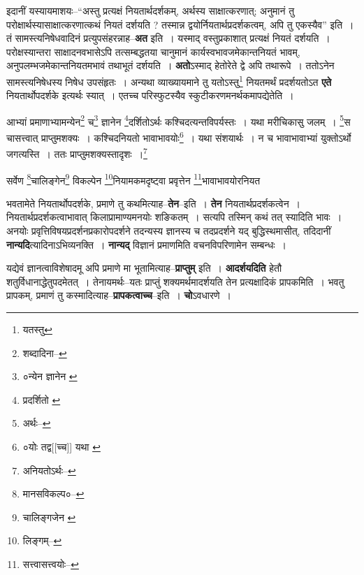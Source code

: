 \documentclass[article,12pt,a4paper]{memoir}
\begin{document}
	  \pstart इदानीं यस्यायमाशयः--“अस्तु प्रत्यक्षं नियतार्थदर्शकम्, अर्थस्य साक्षात्करणात्; अनुमानं तु परोक्षार्थस्यासाक्षात्करणात्कथं नियतं दर्शयति ? तस्मान्न द्वयोर्नियतार्थप्रदर्शकत्वम्, अपि तु एकस्यैव” इति । तं सामस्त्यनिषेधवादिनं प्रत्युपसंहरन्नाह--\textbf{अत} इति । यस्माद् वस्तुप्रकाशात् प्रत्यक्षं नियतं दर्शयति । परोक्षस्यान्तरा साक्षादनवभासेऽपि तत्सम्बद्धतया चानुमानं कार्यस्वभावजमेकान्तनियतं भावम्, अनुपलम्भजमेकान्तनियतमभावं तथाभूतं दर्शयति । \textbf{अतो}ऽस्माद् हेतोरेते द्वे अपि तथारूपे । ततोऽनेन सामस्त्यनिषेधस्य निषेध उपसंहृतः । अन्यथा व्याख्यायमाने तु यतोऽस्तु\footnote{यतस्तु} नियतमर्थं प्रदर्शयतोऽत \textbf{एते} नियतार्थोपदर्शके इत्यर्थः स्यात् । एतच्च परिस्फुटस्यैव स्कुटीकरणमनर्थकमापद्येतेति ।
	\pend
      \leavevmode{}
	  \bigskip
	  \begingroup
	

	  \pstart आभ्यां प्रमाणाभ्यामन्येन\footnote{शब्दादिना--\cite{dp-msD-n}} च\footnote{०न्येन ज्ञानेन \cite{dp-edE} \cite{dp-edN}} ज्ञानेन \footnote{प्रदर्शितो \cite{dp-msA} \cite{dp-msC} \cite{dp-edP} \cite{dp-edN}}दर्शितोऽर्थः कश्चिदत्यन्तविपर्यस्तः । यथा मरीचिकासु जलम् । \footnote{अर्थः--\cite{dp-msD-n}}स चासत्त्वात् प्राप्तुमशक्यः । कश्चिदनियतो भावाभावयोः\footnote{०योः तद्व[[च्च]] यथा \cite{dp-msC}} । यथा संशयार्थः । न च भावाभावाभ्यां युक्तोऽर्थो जगत्यस्ति । ततः प्राप्तुमशक्यस्तादृशः ।\footnote{अनियतोऽर्थः--\cite{dp-msD-n}}
	\pend
       

	  \pstart सर्वेण \footnote{मानसविकल्प०--\cite{dp-msD-n}}चालिङ्गेन\footnote{चालिङ्गजेन \cite{dp-msC} \cite{dp-msD} \cite{dp-msA} \cite{dp-msB} \cite{dp-edP} \cite{dp-edH} \cite{dp-edE} \cite{dp-edN}} विकल्पेन \footnote{लिङ्गम्--\cite{dp-msD-n}}नियामकमदृष्ट्वा प्रवृत्तेन \footnote{सत्त्वासत्त्वयोः--\cite{dp-msD-n}}भावाभावयोरनियत
	\pend
      
	  \endgroup
	

	  \pstart भवतामेते नियतार्थोपदर्शके, प्रमाणे तु कथमित्याह--\textbf{तेन}--इति । \textbf{तेन} नियतार्थप्रदर्शकत्वेन । नियतार्थप्रदर्शकत्वाभावात् किलाप्रामाण्यमनयोः शङिकतम् । सत्यपि तस्मिन् कथं तत् स्यादिति भावः । अनयोः प्रवृत्तिविषयप्रदर्शनप्रकारोपदर्शने तदन्यस्य ज्ञानस्य च तदप्रदर्शने यद् बुद्धिस्थमासीत्, तदिदानीं \textbf{नान्यदि}त्यादिनाऽभिव्यनक्ति । \textbf{नान्यद्} विज्ञानं प्रमाणमिति वचनविपरिणामेन सम्बन्धः ।
	\pend
      

	  \pstart यद्येवं ज्ञानत्वाविशेषादमू अपि प्रमाणे मा भूतामित्याह--\textbf{प्राप्तुम्} इति । \textbf{आदर्शयदिति} हेतौ शतुर्विधानाद्धेतुपदमेतत् । तेनायमर्थः--यतः प्राप्तुं शक्यमर्थमादर्शयति तेन प्रत्यक्षादिकं प्रापकमिति । भवतु प्रापकम्, प्रमाणं तु कस्मादित्याह--\textbf{प्रापकत्वाच्च}--इति । \textbf{चो}ऽवधारणे ।
	\pend
      
\end{document}
